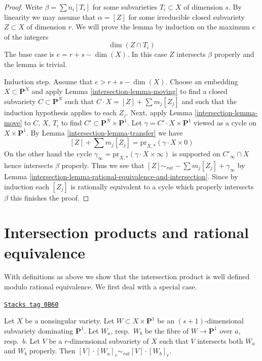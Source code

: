 \begin{proof}

Write $\beta = \sum n_i[T_i]$ for some subvarieties $T_i \subset X$
of dimension $s$. By linearity we may assume that $\alpha = [Z]$ for
some irreducible closed subvariety $Z \subset X$ of dimension $r$.
We will prove the lemma by induction on the maximum $e$ of the integers
$$
\dim(Z \cap T_i)
$$
The base case is $e = r + s - \dim(X)$. In this case $Z$ intersects
$\beta$ properly and the lemma is trivial.

\medskip\noindent
Induction step. Assume that $e > r + s - \dim(X)$. Choose an embedding
$X \subset \mathbf{P}^N$ and apply Lemma \ref{intersection-lemma-moving} to find a
closed subvariety $C \subset \mathbf{P}^N$ such that
$C \cdot X = [Z] + \sum m_j[Z_j]$ and such that the induction
hypothesis applies to each $Z_j$. Next, apply Lemma \ref{intersection-lemma-move}
to $C$, $X$, $T_i$ to find $C' \subset \mathbf{P}^N \times \mathbf{P}^1$.
Let $\gamma = C' \cdot X \times \mathbf{P}^1$ viewed as a cycle
on $X \times \mathbf{P}^1$. By Lemma \ref{intersection-lemma-transfer} we have
$$
[Z] + \sum m_j[Z_j] = \text{pr}_{X, *}(\gamma \cdot X \times 0)
$$
On the other hand the cycle
$\gamma_\infty = \text{pr}_{X, *}(\gamma \cdot X \times \infty)$
is supported on $C'_\infty \cap X$ hence intersects $\beta$ properly.
Thus we see that $[Z] \sim_{rat} - \sum m_j[Z_j] + \gamma_\infty$
by Lemma \ref{intersection-lemma-rational-equivalence-and-intersection}. Since by
induction each $[Z_j]$ is rationally equivalent to a cycle which properly
intersects $\beta$ this finishes the proof.
\end{proof}

\section{Intersection products and rational equivalence}
\label{intersection-section-intersections-and-rational-equivalence}
With definitions as above we show that the intersection product
is well defined modulo rational equivalence. We first deal with a
special case.

\begin{lemma}
\label{intersection-lemma-well-defined-special-case}
\href{https://stacks.math.columbia.edu/tag/0B60}{\texttt{Stacks tag 0B60}}

Let $X$ be a nonsingular variety. Let
$W \subset X \times \mathbf{P}^1$ be an $(s + 1)$-dimensional subvariety
dominating $\mathbf{P}^1$. Let $W_a$, resp.\ $W_b$ be the fibre of
$W \to \mathbf{P}^1$ over $a$, resp.\ $b$. Let $V$ be a $r$-dimensional
subvariety of $X$ such that $V$ intersects both $W_a$ and
$W_b$ properly. Then $[V] \cdot [W_a]_r \sim_{rat} [V] \cdot [W_b]_r$.
\end{lemma}

